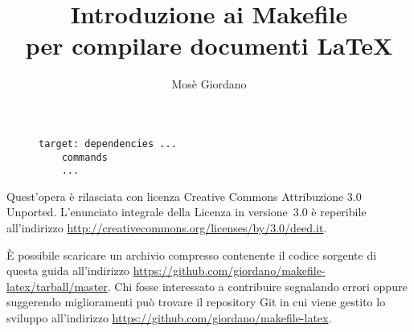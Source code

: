 \documentclass[a4paper]{article}
\title{Introduzione ai Makefile \\
  per compilare documenti \LaTeX}
\author{Mosè Giordano}
\begin{document}
\maketitle

\begin{figure}[h]
  \centering
  \begin{minipage}{0.48\linewidth}
\begin{lstlisting}
target: dependencies ...
	commands
	...
\end{lstlisting}
  \end{minipage}
\end{figure}

\begin{multicols}{2}
  \small \tableofcontents
\end{multicols}






\printbibliography

\vfill

\noindent Quest'opera è rilasciata con licenza Creative Commons Attribuzione 3.0
Unported.  L'enunciato integrale della Licenza in versione~3.0 è reperibile
all'indirizzo \url{http://creativecommons.org/licenses/by/3.0/deed.it}.

È possibile scaricare un archivio compresso contenente il codice sorgente di
questa guida all'indirizzo
\url{https://github.com/giordano/makefile-latex/tarball/master}.  Chi fosse
interessato a contribuire segnalando errori oppure suggerendo miglioramenti può
trovare il repository Git in cui viene gestito lo sviluppo all'indirizzo
\url{https://github.com/giordano/makefile-latex}.
\end{document}
